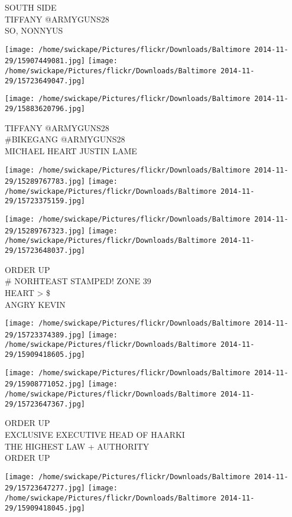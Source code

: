 \documentclass[10pt,letterpaper]{article}
\begin{document}
SOUTH SIDE\\
TIFFANY @ARMYGUNS28\\
SO, NONNYUS
\pagebreak

\texttt{[image: /home/swickape/Pictures/flickr/Downloads/Baltimore 2014-11-29/15907449081.jpg]}
\texttt{[image: /home/swickape/Pictures/flickr/Downloads/Baltimore 2014-11-29/15723649047.jpg]}

\vspace{0.25in}
\texttt{[image: /home/swickape/Pictures/flickr/Downloads/Baltimore 2014-11-29/15883620796.jpg]}

TIFFANY @ARMYGUNS28\\
\#BIKEGANG @ARMYGUNS28\\
MICHAEL HEART JUSTIN LAME
\pagebreak

\texttt{[image: /home/swickape/Pictures/flickr/Downloads/Baltimore 2014-11-29/15289767783.jpg]}
\texttt{[image: /home/swickape/Pictures/flickr/Downloads/Baltimore 2014-11-29/15723375159.jpg]}

\texttt{[image: /home/swickape/Pictures/flickr/Downloads/Baltimore 2014-11-29/15289767323.jpg]}
\texttt{[image: /home/swickape/Pictures/flickr/Downloads/Baltimore 2014-11-29/15723648037.jpg]}

ORDER UP\\
\# NORHTEAST STAMPED! ZONE 39\\
HEART > \$\\
ANGRY KEVIN
\pagebreak

\texttt{[image: /home/swickape/Pictures/flickr/Downloads/Baltimore 2014-11-29/15723374389.jpg]}
\texttt{[image: /home/swickape/Pictures/flickr/Downloads/Baltimore 2014-11-29/15909418605.jpg]}

\texttt{[image: /home/swickape/Pictures/flickr/Downloads/Baltimore 2014-11-29/15908771052.jpg]}
\texttt{[image: /home/swickape/Pictures/flickr/Downloads/Baltimore 2014-11-29/15723647367.jpg]}

ORDER UP\\
EXCLUSIVE EXECUTIVE HEAD OF HAARKI\\
THE HIGHEST LAW + AUTHORITY\\
ORDER UP
\pagebreak

\texttt{[image: /home/swickape/Pictures/flickr/Downloads/Baltimore 2014-11-29/15723647277.jpg]}
\texttt{[image: /home/swickape/Pictures/flickr/Downloads/Baltimore 2014-11-29/15909418045.jpg]}
\end{document}
